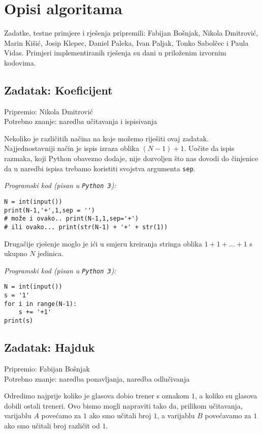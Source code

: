 \documentclass[a4paper]{article}
\begin{document}
\section*{Opisi algoritama}
Zadatke, testne primjere i rješenja pripremili: Fabijan Bošnjak, Nikola
Dmitrović, Marin Kišić, Josip Klepec, Daniel Paleka, Ivan Paljak, Tonko
Sabolčec i Paula Vidas. Primjeri implementiranih rješenja su dani u priloženim
izvornim kodovima.

\subsection*{Zadatak: Koeficijent}
\textsf{Pripremio: Nikola Dmitrović}\\
\textsf{Potrebno znanje: naredba učitavanja i ispisivanja}

Nekoliko je različitih načina na koje možemo riješiti ovaj zadatak.
Najjednostavniji način je ispis izraza oblika $(N-1)+1$. Uočite da ispis
razmaka, koji Python obavezno dodaje, nije dozvoljen što nas dovodi do
činjenice da u naredbi ispisa trebamo koristiti svojstva argumenta
\texttt{sep}.

\textit{Programski kod (pisan u \texttt{Python 3}):}

\vspace{-2ex}
\begin{verbatim}
N = int(input())
print(N-1,'+',1,sep = '')
# može i ovako.. print(N-1,1,sep='+')
# ili ovako... print(str(N-1) + '+' + str(1))
\end{verbatim}

Drugačije rješenje moglo je ići u smjeru kreiranja stringa oblika $1+1+\dots+1$
s ukupno $N$ jedinica.

\textit{Programski kod (pisan u \texttt{Python 3}):}

\vspace{-2ex}
\begin{verbatim}
N = int(input())
s = '1'
for i in range(N-1):
    s += '+1'
print(s)
\end{verbatim}

\subsection*{Zadatak: Hajduk}
\textsf{Pripremio: Fabijan Bošnjak}\\
\textsf{Potrebno znanje: naredba ponavljanja, naredba odlučivanja}

Odredimo najprije koliko je glasova dobio trener s oznakom $1$, a koliko su
glasova dobili ostali treneri. Ovo bismo mogli napraviti tako da, prilikom
učitavanja, varijablu $A$ povećamo za $1$ ako smo učitali broj $1$, a
varijablu $B$ povećavamo za $1$ ako smo učitali broj različit od $1$.
\end{document}
